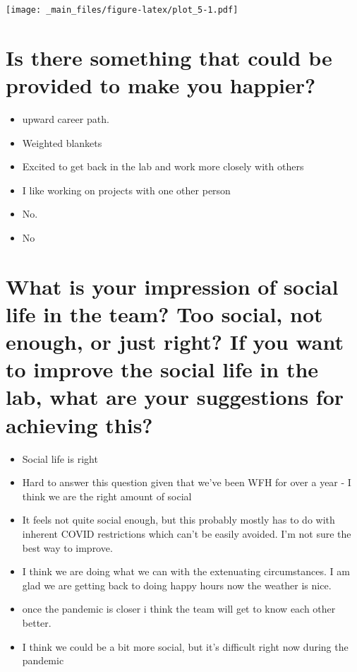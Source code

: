 \documentclass[
]{book}
\providecommand{\tightlist}{%
  \setlength{\itemsep}{0pt}\setlength{\parskip}{0pt}}
\begin{document}
\texttt{[image: \_main\_files/figure-latex/plot\_5-1.pdf]}

\hypertarget{is-there-something-that-could-be-provided-to-make-you-happier}{%
\section{Is there something that could be provided to make you happier?}\label{is-there-something-that-could-be-provided-to-make-you-happier}}

\begin{itemize}
\tightlist
\item
  upward career path.
\item
  Weighted blankets
\item
  Excited to get back in the lab and work more closely with others
\item
  I like working on projects with one other person
\item
  No.
\item
  No
\end{itemize}

\hypertarget{what-is-your-impression-of-social-life-in-the-team-too-social-not-enough-or-just-right-if-you-want-to-improve-the-social-life-in-the-lab-what-are-your-suggestions-for-achieving-this}{%
\section{What is your impression of social life in the team? Too social, not enough, or just right? If you want to improve the social life in the lab, what are your suggestions for achieving this?}\label{what-is-your-impression-of-social-life-in-the-team-too-social-not-enough-or-just-right-if-you-want-to-improve-the-social-life-in-the-lab-what-are-your-suggestions-for-achieving-this}}

\begin{itemize}
\tightlist
\item
  Social life is right
\item
  Hard to answer this question given that we've been WFH for over a year - I think we are the right amount of social
\item
  It feels not quite social enough, but this probably mostly has to do with inherent COVID restrictions which can't be easily avoided. I'm not sure the best way to improve.
\item
  I think we are doing what we can with the extenuating circumstances. I am glad we are getting back to doing happy hours now the weather is nice.
\item
  once the pandemic is closer i think the team will get to know each other better.
\item
  I think we could be a bit more social, but it's difficult right now during the pandemic
\end{itemize}
\end{document}
